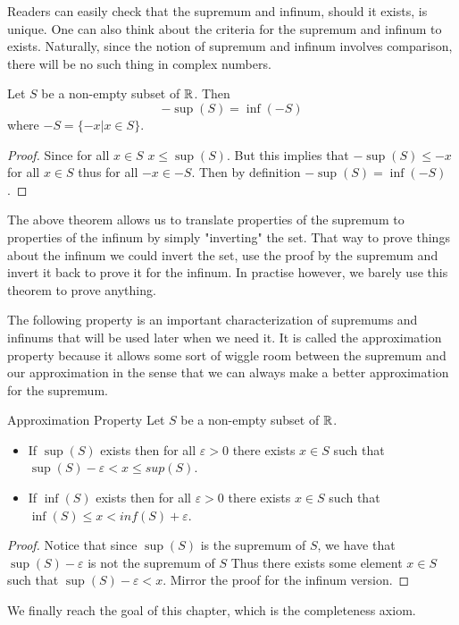\documentclass[a4paper]{article}
\begin{document}
Readers can easily check that the supremum and infinum, should it exists, is unique. One can also think about the criteria for the supremum and infinum to exists. Naturally, since the notion of supremum and infinum involves comparison, there will be no such thing in complex numbers. 

\begin{thm}{}{} Let $S$ be a non-empty subset of $\mathbb{R}$. Then $$-\sup(S)=\inf(-S)$$ where $-S=\{-x|x\in S\}$. \tcbline
\begin{proof} Since for all $x\in S$ $x\leq\sup(S)$. But this implies that $-\sup(S)\leq-x$ for all $x\in S$ thus for all $-x\in-S$. Then by definition $-\sup(S)=\inf(-S)$. 
\end{proof}
\end{thm}

The above theorem allows us to translate properties of the supremum to properties of the infinum by simply "inverting" the set. That way to prove things about the infinum we could invert the set, use the proof by the supremum and invert it back to prove it for the infinum. In practise however, we barely use this theorem to prove anything. 

The following property is an important characterization of supremums and infinums that will be used later when we need it. It is called the approximation property because it allows some sort of wiggle room between the supremum and our approximation in the sense that we can always make a better approximation for the supremum. 

\begin{thm}{Approximation Property}{} Let $S$ be a non-empty subset of $\mathbb{R}$. 
\begin{itemize}
\item If $\sup(S)$ exists then for all $\varepsilon>0$ there exists $x\in S$ such that $\sup(S)-\varepsilon<x\leq sup(S)$. 
\item If $\inf(S)$ exists then for all $\varepsilon>0$ there exists $x\in S$ such that $\inf(S)\leq x<inf(S)+\varepsilon$. 
\end{itemize}\tcbline
\begin{proof} Notice that since $\sup(S)$ is the supremum of $S$, we have that $\sup(S)-\varepsilon$ is not the supremum of $S$ Thus there exists some element $x\in S$ such that $\sup(S)-\varepsilon<x$. Mirror the proof for the infinum version. 
\end{proof}
\end{thm}

We finally reach the goal of this chapter, which is the completeness axiom. 
\end{document}
